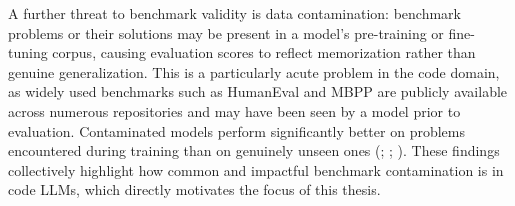 \documentclass[mscthesis]{usiinfthesis}
\begin{document}
A further threat to benchmark validity is data contamination: benchmark problems or their solutions may be present in a model's pre-training or fine-tuning corpus, causing evaluation scores to reflect memorization rather than genuine generalization. This is a particularly acute problem in the code domain, as widely used benchmarks such as HumanEval and MBPP are publicly available across numerous repositories and may have been seen by a model prior to evaluation. Contaminated models perform significantly better on problems encountered during training than on genuinely unseen ones (\citet{riddell2024quantifyingcontaminationevaluatingcode}; \citet{matton2024leakagecodegenerationevaluation}; \citet{zhou2025lessleakbenchinvestigationdataleakage}). These findings collectively highlight how common and impactful benchmark contamination is in code LLMs, which directly motivates the focus of this thesis.
\end{document}
